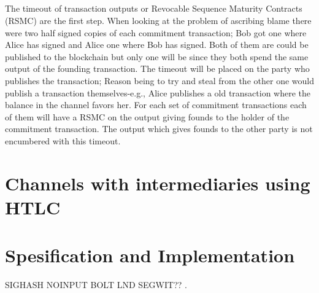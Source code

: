 \documentclass[informationsecurity]{gucmasterproject}
\begin{document}
\paragraph{}
The timeout of transaction outputs or Revocable Sequence Maturity Contracts (RSMC) are the first step. When looking at the problem of ascribing blame there were two half signed copies of each commitment transaction; Bob got one where Alice has signed and Alice one where Bob has signed. Both of them are could be published to the blockchain but only one will be since they both spend the same output of the founding transaction. The timeout will be placed on the party who publishes the transaction; Reason being to try and steal from the other one would publish a transaction themselves-e.g., Alice publishes a old transaction where the balance in the channel favors her. For each set of commitment transactions each of them will have a RSMC on the output giving founds to the holder of the commitment transaction. The output which gives founds to the other party is not encumbered with this timeout. 

\chapter{Channels with intermediaries using HTLC}

\chapter{Spesification and Implementation}
SIGHASH NOINPUT
BOLT 
LND
SEGWIT??
.






%

\end{document}
